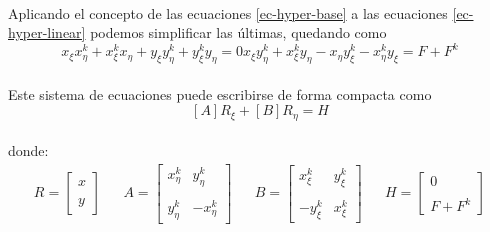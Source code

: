 \documentclass[letterpaper, openright, 12pt]{book}
\begin{document}
    \paragraph*{}
        Aplicando el concepto de las ecuaciones \ref{ec-hyper-base} a las
        ecuaciones \ref{ec-hyper-linear} podemos simplificar las últimas,
        quedando como
        \begin{subequations}
            \begin{equation}
                x_{\xi} x_{\eta}^{k} + x_{\xi}^{k} x_{\eta} + y_{\xi} y_{\eta}^{k} + y_{\xi}^{k} y_{\eta} = 0
            \end{equation}
            \begin{equation}
                x_{\xi} y_{\eta}^{k} + x_{\xi}^{k} y_{\eta} - x_{\eta} y_{\xi}^{k} - x_{\eta}^{k} y_{\xi} = F + F^{k}
            \end{equation}
            \label{ec-hyper-reducida}
        \end{subequations}
    \paragraph*{}
        Este sistema de ecuaciones puede escribirse de forma compacta como
        \begin{equation}
            \left[A \right] R_{\xi} + \left[ B \right] R_{\eta} = H
            \label{ec-hyper-compacta}
        \end{equation}\\ 
        donde:
        \begin{align*}
            R = \begin{bmatrix}
            x \\ \\
            y
            \end{bmatrix}&&
            A = \begin{bmatrix}
            x_{\eta}^{k} & y_{\eta}^{k} \\ \\
            y_{\eta}^{k} & -x_{\eta}^{k}
            \end{bmatrix}&&
            B = \begin{bmatrix}
            x_{\xi}^{k} & y_{\xi}^{k} \\ \\
            -y_{\xi}^{k} & x_{\xi}^{k}
            \end{bmatrix}&&
            H = \begin{bmatrix}
            0 \\ \\
            F + F^{k}
            \end{bmatrix}
        \end{align*}
\end{document}
